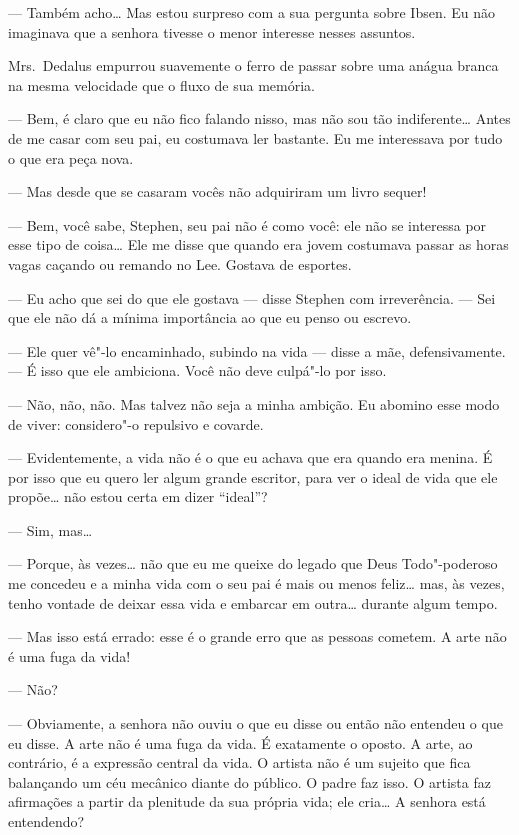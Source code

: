 --- Também acho\ldots{}  Mas estou surpreso com a sua pergunta sobre
Ibsen.  Eu não imaginava que a senhora tivesse o menor interesse nesses
assuntos.

Mrs.~Dedalus empurrou suavemente o ferro de passar sobre uma anágua
branca \label{na"-mesma} na mesma velocidade que o fluxo de sua memória.

--- Bem, é claro que eu não fico falando nisso, mas não sou tão
indiferente\ldots{}  Antes de me casar com seu pai, eu costumava ler
bastante.  Eu me interessava por tudo o que era peça nova.

--- Mas desde que se casaram vocês não adquiriram um livro
sequer!

--- Bem, você sabe, Stephen, seu pai não é como você: ele não se
interessa por esse tipo de coisa\ldots{}  Ele me disse que quando era jovem
costumava passar as horas vagas caçando ou remando no Lee.  Gostava de
esportes.

--- Eu acho que sei do que ele gostava --- disse Stephen com
irreverência.  --- Sei que ele não dá a mínima importância ao que eu
penso ou escrevo.

--- Ele quer vê"-lo encaminhado, subindo na vida --- disse a mãe,
defensivamente.  --- É isso que ele ambiciona.  Você não deve culpá"-lo
por isso.

--- Não, não, não.  Mas talvez não seja a minha ambição.  Eu
abomino esse modo de viver: considero"-o repulsivo e covarde.

--- Evidentemente, a vida não é o que eu achava que era quando
era menina.  É por isso que eu quero ler algum grande escritor, para
ver o ideal de vida que ele propõe\ldots{} não estou certa em dizer “ideal”?

--- Sim, mas\ldots{}

--- Porque, às vezes\ldots{} não que eu me queixe do legado que Deus
Todo"-poderoso me concedeu e a minha vida com o seu pai é mais ou menos
feliz\ldots{} mas, às vezes, tenho vontade de deixar essa vida e embarcar em
outra\ldots{} durante algum tempo.

--- Mas isso está errado: esse é o grande erro que as pessoas
cometem.  A arte não é uma fuga da vida!

--- Não?

--- Obviamente, a senhora não ouviu o que eu disse ou então não
entendeu o que eu disse.  A arte não é uma fuga da vida.  É exatamente
o oposto.  A arte, ao contrário, é a expressão central da vida.  O
artista não é um sujeito que fica balançando um céu mecânico diante do
público.  O padre faz isso.  O artista faz afirmações a partir da
plenitude da sua própria vida; ele cria\ldots{}  A senhora está entendendo?

